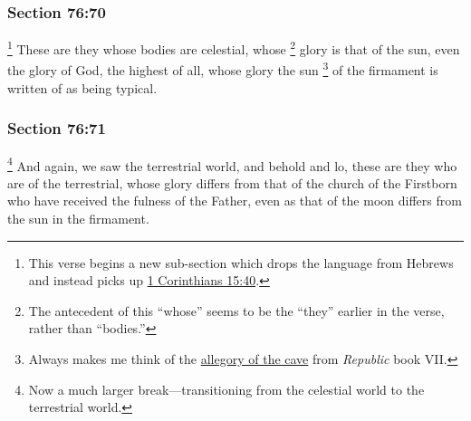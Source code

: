 	\subsubsection{Section 76:70} %
		\label{DC76-70}

			\footnote{%
				This verse begins a new sub-section which drops the language from Hebrews and instead picks up \hyperref[1CORINTHIANS-15-40]{1 Corinthians 15:40}.
				}%
		These are they whose bodies are celestial, whose%
			\footnote{%
				The antecedent of this ``whose'' seems to be the ``they'' earlier in the verse, rather than ``bodies.'' 
				}
		glory is that of the sun, even the glory of God, the highest of all, whose glory the sun%
		\footnote{%
			Always makes me think of the \hyperref[TTW-DEVELOPMENT-PHILOSOPHICAL-001]{allegory of the cave} from \textit{Republic} book VII.
			} 
		of the firmament is written of as being typical.


	\subsubsection{Section 76:71} %
		\label{DC76-71}

			\footnote{%
				Now a much larger break---transitioning from the celestial world to the terrestrial world.
				}%
		And again, we saw the terrestrial world, and behold and lo, these are they who are of the terrestrial, whose glory differs from that of the church of the Firstborn who have received the fulness of the Father, even as that of the moon differs from the sun in the firmament.


